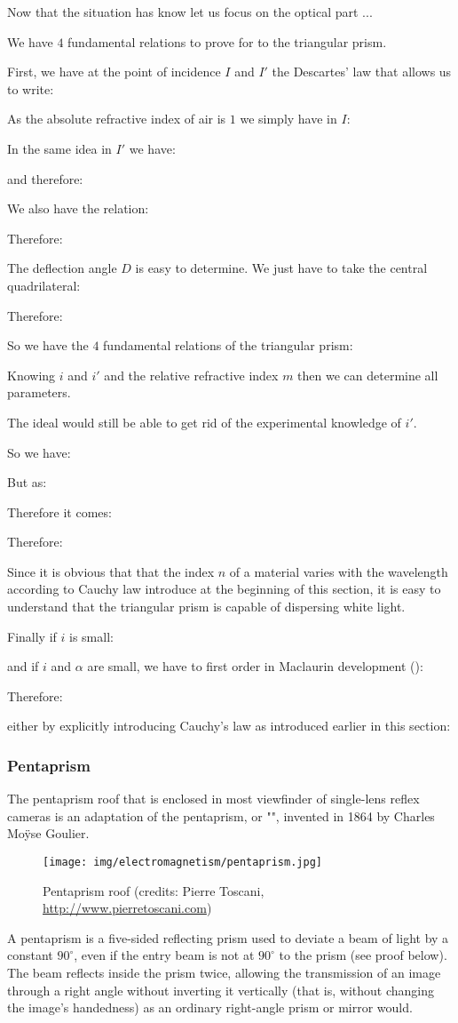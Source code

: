 	Now that the situation has know let us focus on the optical part ...

	We have $4$ fundamental relations to prove for to the triangular prism.

	First, we have at the point of incidence $I$ and $I'$ the Descartes' law that allows us to write:
	
	As the absolute refractive index of air is $1$ we simply have in $I$:
	
	In the same idea in $I'$ we have:
	
	and therefore:
	
	We also have the relation:
	
	Therefore:
	
	The deflection angle $D$ is easy to determine. We just have to take the central quadrilateral:
	
	Therefore:
	
	So we have the $4$ fundamental relations of the triangular prism:
	
	Knowing $i$ and $i'$ and the relative refractive index $m$ then we can determine all parameters.

	The ideal would still be able to get rid of the experimental knowledge of $i'$.

	So we have:
	
	But as:
	
	Therefore it comes:
	
	Therefore:
	
	Since it is obvious that that the index $n$ of a material varies with the wavelength according to Cauchy law introduce at the beginning of this section, it is easy to understand that the triangular prism is capable of dispersing white light.

	Finally if $i$ is small:
	
	and if $i$ and $\alpha$ are small, we have to first order in Maclaurin development ():
	
	Therefore:
	
	either by explicitly introducing Cauchy's law as introduced earlier in this section:
	
	
	\pagebreak
	\subsubsection{Pentaprism}
	The pentaprism roof that is enclosed  in most viewfinder of single-lens reflex cameras is an adaptation of the pentaprism, or "", invented in 1864 by Charles Moÿse Goulier.
	\begin{figure}[H]
		\centering
		\texttt{[image: img/electromagnetism/pentaprism.jpg]}
		\caption{Pentaprism roof (credits: Pierre Toscani, \url{http://www.pierretoscani.com})}
	\end{figure}
	A pentaprism is a five-sided reflecting prism used to deviate a beam of light by a constant $90^\circ$, even if the entry beam is not at $90^\circ$ to the prism (see proof below). The beam reflects inside the prism twice, allowing the transmission of an image through a right angle without inverting it vertically (that is, without changing the image's handedness) as an ordinary right-angle prism or mirror would.
	
